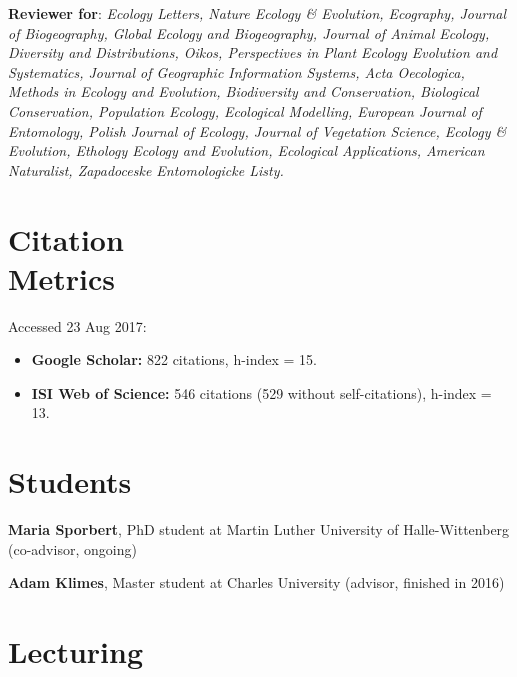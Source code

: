{\bf Reviewer for}: \textit{Ecology Letters, Nature Ecology \& Evolution, Ecography, Journal of Biogeography, Global Ecology and Biogeography, Journal of Animal Ecology, Diversity and Distributions, Oikos, Perspectives in Plant Ecology Evolution and Systematics, Journal of Geographic Information Systems, Acta Oecologica, Methods in Ecology and Evolution, Biodiversity and Conservation, Biological Conservation, Population Ecology, Ecological Modelling, European Journal of Entomology, Polish Journal of Ecology, Journal of Vegetation Science, Ecology \& Evolution, Ethology Ecology and Evolution, Ecological Applications, American Naturalist, Zapadoceske Entomologicke Listy.}

\HRule

\section{Citation \\ Metrics}

Accessed 23 Aug 2017:

\begin{itemize}
\item \textbf{Google Scholar:} 822 citations, h-index  = 15.
\item \textbf{ISI Web of Science:} 546 citations (529 without self-citations), h-index = 13.
\end{itemize}


\HRule

\section{Students}

\begin{innerlist}

\item[]{\bf Maria Sporbert}, PhD student at Martin Luther University of Halle-Wittenberg (co-advisor, ongoing)


\medskip

\item[]{\bf Adam Klimes}, Master student at Charles University (advisor, finished in 2016)

\end{innerlist}

\HRule

\section{Lecturing}

